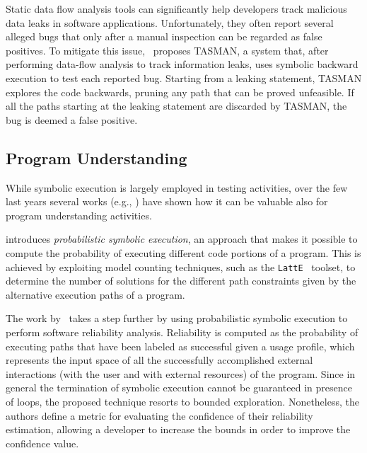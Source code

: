 
\smallskip
Static data flow analysis tools can significantly help developers track malicious data leaks in software applications. Unfortunately, they often report several alleged bugs that only after a manual inspection can be regarded as false positives. To mitigate this issue,~\cite{ARH-SOAP15} proposes TASMAN, a system that, after performing data-flow analysis to track information leaks, uses symbolic backward execution to test each reported bug. Starting from a leaking statement, TASMAN explores the code backwards, pruning any path that can be proved unfeasible. If all the paths starting at the leaking statement are discarded by TASMAN, the bug is deemed a false positive.

\subsection{Program Understanding}
While symbolic execution is largely employed in testing activities, over the few last years several works (e.g., \cite{GDV-ISSTA12,FPV-ICSE13,CLL-ICSE16}) have shown how it can be valuable also for program understanding activities.

\cite{GDV-ISSTA12} introduces {\em probabilistic symbolic execution}, an approach that makes it possible to compute the probability of executing different code portions of a program. This is achieved by exploiting model counting techniques, such as the {\tt LattE}~\cite{LHT-JSC04} toolset, to determine the number of solutions for the different path constraints given by the alternative execution paths of a program.

The work by~\cite{FPV-ICSE13} takes a step further by using probabilistic symbolic execution to perform software reliability analysis. Reliability is computed as the probability of executing paths that have been labeled as successful given a usage profile, which represents the input space of all the successfully accomplished external interactions (with the user and with external resources) of the program.  Since in general the termination of symbolic execution cannot be guaranteed in presence of loops, the proposed technique resorts to bounded exploration. Nonetheless, the authors define a metric for evaluating the confidence of their reliability estimation, allowing a developer to increase the bounds in order to improve the confidence value.

